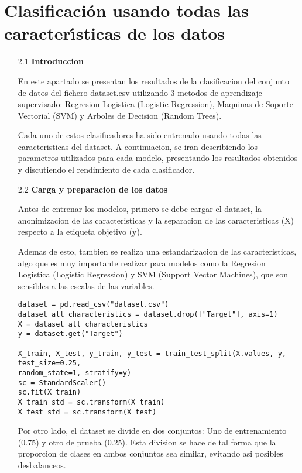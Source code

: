 \documentclass{article}
\begin{document}

\newpage

\section[2]{Clasificaci\'on usando todas las caracter\'{\i}sticas de los datos}

\begin{itemize}

\item[2.1]  {\bf Introduccion}

En este apartado se presentan los resultados de la clasificacion del conjunto de datos del fichero dataset.csv utilizando 3 metodos de aprendizaje supervisado: Regresion Logistica (Logistic Regression), Maquinas de Soporte Vectorial (SVM) y Arboles de Decision (Random Trees).

Cada uno de estos clasificadores ha sido entrenado usando todas las caracteristicas del dataset. A continuacion, se iran describiendo los parametros utilizados para cada modelo, presentando los resultados obtenidos y discutiendo el rendimiento de cada clasificador.

\end{itemize}

\bigskip

\begin{itemize}

\item[2.2]  {\bf Carga y preparacion de los datos}

Antes de entrenar los modelos, primero se debe cargar el dataset, la anonimizacion de las caracteristicas y la separacion de las caracteristicas (X) respecto a la etiqueta objetivo (y). 

Ademas de esto, tambien se realiza una estandarizacion de las caracteristicas, algo que es muy importante realizar para modelos como la Regresion Logistica (Logistic Regression) y SVM (Support Vector Machines), que son sensibles a las escalas de las variables.

\begin{tcolorbox}[width=14cm]
\begin{scriptsize}
\begin{verbatim}
dataset = pd.read_csv("dataset.csv")
dataset_all_characteristics = dataset.drop(["Target"], axis=1)
X = dataset_all_characteristics
y = dataset.get("Target")

X_train, X_test, y_train, y_test = train_test_split(X.values, y, test_size=0.25, 
random_state=1, stratify=y)
sc = StandardScaler()
sc.fit(X_train)
X_train_std = sc.transform(X_train)
X_test_std = sc.transform(X_test)
\end{verbatim}
\end{scriptsize}
\end{tcolorbox}

Por otro lado, el dataset se divide en dos conjuntos: Uno de entrenamiento (0.75) y otro de prueba (0.25). Esta division se hace de tal forma que la proporcion de clases en ambos conjuntos sea similar, evitando asi posibles desbalanceos.

\end{itemize}
\end{document}

